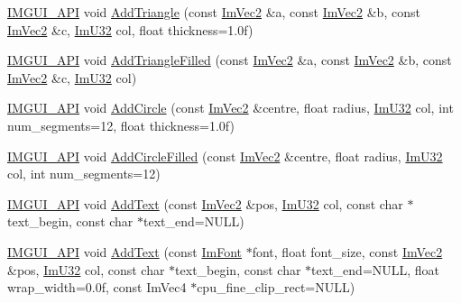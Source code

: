\begin{DoxyCompactItemize}
\item 
\mbox{\hyperlink{imgui_8h_a43829975e84e45d1149597467a14bbf5}{I\+M\+G\+U\+I\+\_\+\+A\+PI}} void \mbox{\hyperlink{struct_im_draw_list_ad04c8e04644b1cf54c7c7b8f352d5e41}{Add\+Triangle}} (const \mbox{\hyperlink{struct_im_vec2}{Im\+Vec2}} \&a, const \mbox{\hyperlink{struct_im_vec2}{Im\+Vec2}} \&b, const \mbox{\hyperlink{struct_im_vec2}{Im\+Vec2}} \&c, \mbox{\hyperlink{imgui_8h_a118cff4eeb8d00e7d07ce3d6460eed36}{Im\+U32}} col, float thickness=1.\+0f)
\item 
\mbox{\hyperlink{imgui_8h_a43829975e84e45d1149597467a14bbf5}{I\+M\+G\+U\+I\+\_\+\+A\+PI}} void \mbox{\hyperlink{struct_im_draw_list_a2395370cf2dab19fce3c0e2542cd4f25}{Add\+Triangle\+Filled}} (const \mbox{\hyperlink{struct_im_vec2}{Im\+Vec2}} \&a, const \mbox{\hyperlink{struct_im_vec2}{Im\+Vec2}} \&b, const \mbox{\hyperlink{struct_im_vec2}{Im\+Vec2}} \&c, \mbox{\hyperlink{imgui_8h_a118cff4eeb8d00e7d07ce3d6460eed36}{Im\+U32}} col)
\item 
\mbox{\hyperlink{imgui_8h_a43829975e84e45d1149597467a14bbf5}{I\+M\+G\+U\+I\+\_\+\+A\+PI}} void \mbox{\hyperlink{struct_im_draw_list_a26c34a87eca6aefa02ca4e4951dcd170}{Add\+Circle}} (const \mbox{\hyperlink{struct_im_vec2}{Im\+Vec2}} \&centre, float radius, \mbox{\hyperlink{imgui_8h_a118cff4eeb8d00e7d07ce3d6460eed36}{Im\+U32}} col, int num\+\_\+segments=12, float thickness=1.\+0f)
\item 
\mbox{\hyperlink{imgui_8h_a43829975e84e45d1149597467a14bbf5}{I\+M\+G\+U\+I\+\_\+\+A\+PI}} void \mbox{\hyperlink{struct_im_draw_list_a293e87d22e17587e3994cf6deb20be45}{Add\+Circle\+Filled}} (const \mbox{\hyperlink{struct_im_vec2}{Im\+Vec2}} \&centre, float radius, \mbox{\hyperlink{imgui_8h_a118cff4eeb8d00e7d07ce3d6460eed36}{Im\+U32}} col, int num\+\_\+segments=12)
\item 
\mbox{\hyperlink{imgui_8h_a43829975e84e45d1149597467a14bbf5}{I\+M\+G\+U\+I\+\_\+\+A\+PI}} void \mbox{\hyperlink{struct_im_draw_list_ac5221bd86b3429f6d5b6e6ffe454942d}{Add\+Text}} (const \mbox{\hyperlink{struct_im_vec2}{Im\+Vec2}} \&pos, \mbox{\hyperlink{imgui_8h_a118cff4eeb8d00e7d07ce3d6460eed36}{Im\+U32}} col, const char $\ast$text\+\_\+begin, const char $\ast$text\+\_\+end=N\+U\+LL)
\item 
\mbox{\hyperlink{imgui_8h_a43829975e84e45d1149597467a14bbf5}{I\+M\+G\+U\+I\+\_\+\+A\+PI}} void \mbox{\hyperlink{struct_im_draw_list_a0a226cbe9bb1480428e145d8535cda26}{Add\+Text}} (const \mbox{\hyperlink{struct_im_font}{Im\+Font}} $\ast$font, float font\+\_\+size, const \mbox{\hyperlink{struct_im_vec2}{Im\+Vec2}} \&pos, \mbox{\hyperlink{imgui_8h_a118cff4eeb8d00e7d07ce3d6460eed36}{Im\+U32}} col, const char $\ast$text\+\_\+begin, const char $\ast$text\+\_\+end=N\+U\+LL, float wrap\+\_\+width=0.\+0f, const Im\+Vec4 $\ast$cpu\+\_\+fine\+\_\+clip\+\_\+rect=\+N\+U\+L\+L)

\end{DoxyCompactItemize}
